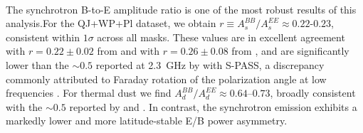 \paragraph{}

The synchrotron B-to-E amplitude ratio is one of the most robust results of this analysis.For the QJ+WP+Pl dataset, we obtain $r \equiv A_s^{BB}/A_s^{EE} \approx 0.22\text{-}0.23$, consistent within $1\sigma$ across all masks. These values are in excellent agreement with $r = 0.22 \pm 0.02$ from \citet{Martire_2022} and with $r = 0.26 \pm 0.08$ from \citet{QUIJOTE_IV}, and are significantly lower than the $\sim 0.5$ reported at 2.3~GHz by \citet{Krachmalnicoff_2018} with S-PASS, a discrepancy commonly attributed to Faraday rotation of the polarization angle at low frequencies \citep{Fuskeland_2021}. For thermal dust we find $A_d^{BB}/A_d^{EE} \approx 0.64$--$0.73$, broadly
consistent with the $\sim 0.5$ reported by \citet{Planck_2018XI} and
\citet{Planck_2016XXX}. In contrast, the synchrotron emission exhibits a
markedly lower and more latitude-stable E/B power asymmetry.

\paragraph{}

